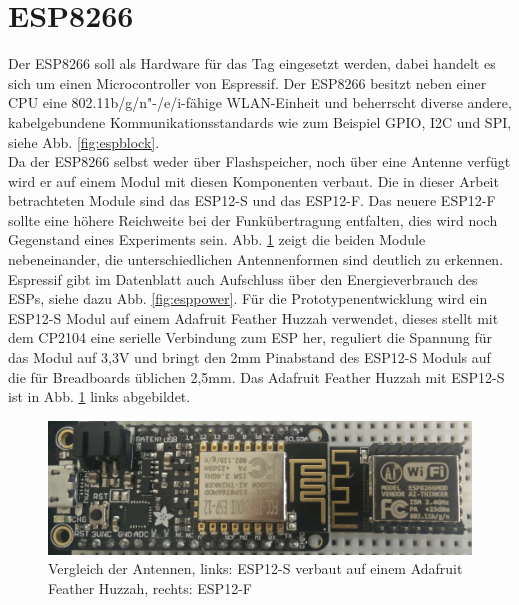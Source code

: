 \section{ESP8266}
Der ESP8266 soll als Hardware für das Tag eingesetzt werden, dabei handelt es sich um einen Microcontroller von Espressif.
Der ESP8266 besitzt neben einer CPU eine 802.11b/g/n"-/e/i-fähige WLAN-Einheit und beherrscht diverse andere, kabelgebundene Kommunikationsstandards wie zum Beispiel GPIO, I2C und SPI, siehe Abb. \ref{fig:espblock}. \\
Da der ESP8266 selbst weder über Flashspeicher, noch über eine Antenne verfügt wird er auf einem Modul mit diesen Komponenten verbaut. 
Die in dieser Arbeit betrachteten Module sind das ESP12-S und das ESP12-F.
Das neuere ESP12-F sollte eine höhere Reichweite bei der Funkübertragung entfalten, dies wird noch Gegenstand eines Experiments sein.
Abb. \ref{fig:espmodules} zeigt die beiden Module nebeneinander, die unterschiedlichen Antennenformen sind deutlich zu erkennen.\\
Espressif gibt im Datenblatt auch Aufschluss über den Energieverbrauch des ESPs, siehe dazu Abb. \ref{fig:esppower}.
Für die Prototypenentwicklung wird ein ESP12-S Modul auf einem Adafruit Feather Huzzah verwendet, dieses stellt mit dem CP2104 eine serielle Verbindung zum ESP her, reguliert die Spannung für das Modul auf 3,3V und bringt den 2mm Pinabstand des ESP12-S Moduls auf die für Breadboards üblichen 2,5mm.
Das Adafruit Feather Huzzah mit ESP12-S ist in Abb. \ref{fig:espmodules} links abgebildet.

\begin{figure}[h]
  \centering
	\includegraphics[width=\textwidth]{images/espmodules.png}
  \caption{Vergleich der Antennen, links: ESP12-S verbaut auf einem Adafruit Feather Huzzah, rechts: ESP12-F}
  \label{fig:espmodules}
\end{figure}

